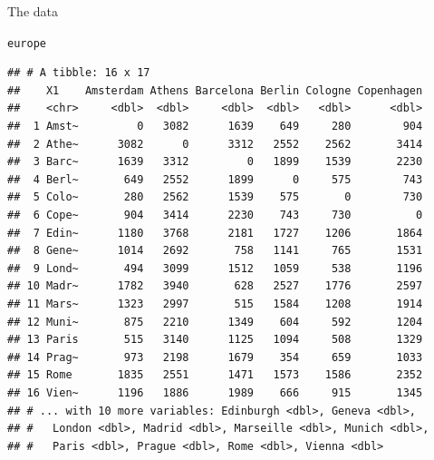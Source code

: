 \documentclass[unknownkeysallowed]{beamer}\usepackage[]{graphicx}\usepackage[]{color}
\makeatletter
\newcommand{\hlstd}[1]{\textcolor[rgb]{0.345,0.345,0.345}{#1}}%
\newenvironment{kframe}{%
 \def\at@end@of@kframe{}%
 \ifinner\ifhmode%
  \def\at@end@of@kframe{\end{minipage}}%
  \begin{minipage}{\columnwidth}%
 \fi\fi%
 \def\FrameCommand##1{\hskip\@totalleftmargin \hskip-\fboxsep
 \colorbox{shadecolor}{##1}\hskip-\fboxsep
     \hskip-\linewidth \hskip-\@totalleftmargin \hskip\columnwidth}%
 \MakeFramed {\advance\hsize-\width
   \@totalleftmargin\z@ \linewidth\hsize
   \@setminipage}}%
 {\par\unskip\endMakeFramed%
 \at@end@of@kframe}
\newenvironment{knitrout}{}{} %
\makeatother
\begin{document}
\begin{frame}[fragile]{The data}
  
\begin{knitrout}\scriptsize
{}\color{fgcolor}\begin{kframe}
\begin{alltt}
\hlstd{europe}
\end{alltt}
\begin{verbatim}
## # A tibble: 16 x 17
##    X1    Amsterdam Athens Barcelona Berlin Cologne Copenhagen
##    <chr>     <dbl>  <dbl>     <dbl>  <dbl>   <dbl>      <dbl>
##  1 Amst~         0   3082      1639    649     280        904
##  2 Athe~      3082      0      3312   2552    2562       3414
##  3 Barc~      1639   3312         0   1899    1539       2230
##  4 Berl~       649   2552      1899      0     575        743
##  5 Colo~       280   2562      1539    575       0        730
##  6 Cope~       904   3414      2230    743     730          0
##  7 Edin~      1180   3768      2181   1727    1206       1864
##  8 Gene~      1014   2692       758   1141     765       1531
##  9 Lond~       494   3099      1512   1059     538       1196
## 10 Madr~      1782   3940       628   2527    1776       2597
## 11 Mars~      1323   2997       515   1584    1208       1914
## 12 Muni~       875   2210      1349    604     592       1204
## 13 Paris       515   3140      1125   1094     508       1329
## 14 Prag~       973   2198      1679    354     659       1033
## 15 Rome       1835   2551      1471   1573    1586       2352
## 16 Vien~      1196   1886      1989    666     915       1345
## # ... with 10 more variables: Edinburgh <dbl>, Geneva <dbl>,
## #   London <dbl>, Madrid <dbl>, Marseille <dbl>, Munich <dbl>,
## #   Paris <dbl>, Prague <dbl>, Rome <dbl>, Vienna <dbl>
\end{verbatim}
\end{kframe}
\end{knitrout}
\end{frame}
\end{document}
